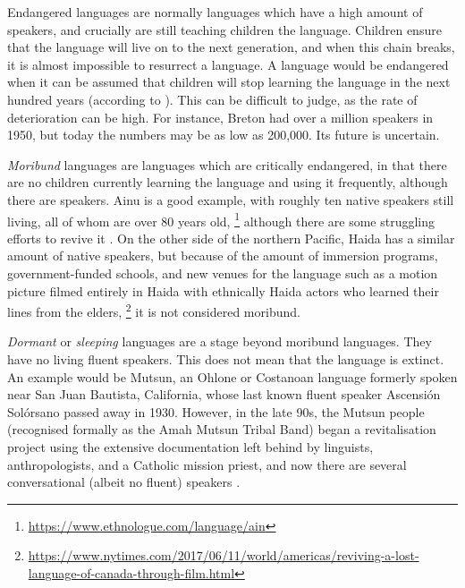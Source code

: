 Endangered languages are normally languages which have a high amount of speakers, and crucially are still teaching children the language. Children ensure that the language will live on to the next generation, and when this chain breaks, it is almost impossible to resurrect a language. A language would be endangered when it can be assumed that children will stop learning the language in the next hundred years (according to \citet{krauss92}). This can be difficult to judge, as the rate of deterioration can be high. For instance, Breton had over a million speakers in 1950, but today the numbers may be as low as 200,000. Its future is uncertain.

\emph{Moribund} languages are languages which are critically endangered, in that there are no children currently learning the language and using it frequently, although there are speakers. Ainu is a good example, with roughly ten native speakers still living, all of whom are over 80 years old, \footnote{\href{https://www.ethnologue.com/language/ain}{https://www.ethnologue.com/language/ain}} although there are some struggling efforts to revive it \citep{hanks2017policy}. On the other side of the northern Pacific, Haida has a similar amount of native speakers, but because of the amount of immersion programs, government-funded schools, and new venues for the language such as a motion picture filmed entirely in Haida with ethnically Haida actors who learned their lines from the elders, \footnote{\href{https://www.nytimes.com/2017/06/11/world/americas/reviving-a-lost-language-of-canada-through-film.html}{https://www.nytimes.com/2017/06/11/world/americas/reviving-a-lost-language-of-canada-through-film.html}} it is not considered moribund.

\emph{Dormant} or \textit{sleeping} languages are a stage beyond moribund languages. They have no living fluent speakers. This does not mean that the language is extinct. An example would be Mutsun, an Ohlone or Costanoan language formerly spoken near San Juan Bautista, California, whose last known fluent speaker Ascensi\'on Sol\'orsano passed away in 1930. However, in the late 90s, the Mutsun people (recognised formally as the Amah Mutsun Tribal Band)  began a revitalisation project using the extensive documentation left behind by linguists, anthropologists, and a Catholic mission priest, and now there are several conversational (albeit no fluent) speakers \citep{warner2007ethics}.

